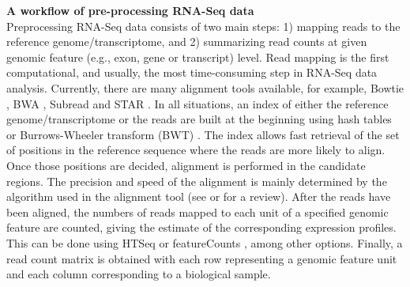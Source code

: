 \textbf{A workflow of pre-processing RNA-Seq data}\\
Preprocessing RNA-Seq data consists of two main steps: 1) mapping reads to the reference
genome/transcriptome, and 2) summarizing read counts at given genomic feature (e.g., exon, gene or
transcript) level. Read mapping is the first computational, and usually, the most time-consuming
step in RNA-Seq data analysis. Currently, there are many alignment tools available, for example,
Bowtie \citep{langmead2012fast,langmead2009ultrafast}, BWA \citep{li2013aligning,li2009fast},
Subread \citep{shi2013subread} and STAR \citep{dobin2013star}. In all situations, an index of either
the reference genome/transcriptome or the reads are built at the beginning using hash tables or Burrows-Wheeler
transform (BWT) \citep{burrows1994block}. The index allows fast retrieval of the set of positions in
the reference sequence where the reads are more likely to align. Once those positions are decided,
alignment is performed in the candidate regions. The precision and speed of the alignment is mainly
determined by the algorithm used in the alignment tool (see \citep{hatem2013benchmarking} or
\cite{li2010survey} for a review). After the reads have been aligned, the numbers of reads mapped to
each unit of a specified genomic feature are counted, giving the estimate of the corresponding
expression profiles. This can be done using HTSeq \cite{anders2010htseq} or featureCounts
\citep{liao2013featurecounts}, among other options. Finally, a read count matrix is
obtained with each row representing a genomic feature unit and each column corresponding to a biological
sample. 

